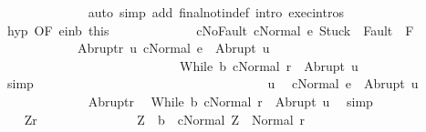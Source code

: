 \begin{isabellebody}
\ \ \ \ \ \ \ \ \ \ \ \ \isamarkupfalse%
\ {\isacharparenleft}auto\ simp\ add{\isacharcolon}\ final{\isacharunderscore}notin{\isacharunderscore}def\ intro{\isacharcolon}\ exec{\isachardot}intros{\isacharparenright}\isanewline
\ \ \ \ \ \ \ \ \ \ \isamarkupfalse%
\ hyp\ {\isacharbrackleft}OF\ e{\isacharunderscore}in{\isacharunderscore}b\ this{\isacharbrackright}\ \isamarkupfalse%
\isanewline
\ \ \ \ \ \ \ \ \ \ \ \ cNoFault{\isacharcolon}\ {\isachardoublequoteopen}{\isasymGamma}{\isasymturnstile}{\isasymlangle}c{\isacharcomma}Normal\ e{\isasymrangle}\ {\isasymRightarrow}{\isasymnotin}{\isacharparenleft}{\isacharbraceleft}Stuck{\isacharbraceright}\ {\isasymunion}\ Fault\ {\isacharbackquote}\ {\isacharparenleft}{\isacharminus}F{\isacharparenright}{\isacharparenright}{\isachardoublequoteclose}\ \isanewline
\ \ \ \ \ \ \ \ \ \ \ \ Abrupt{\isacharunderscore}r{\isacharcolon}\ {\isachardoublequoteopen}{\isasymforall}u{\isachardot}\ {\isasymGamma}{\isasymturnstile}{\isasymlangle}c{\isacharcomma}Normal\ e{\isasymrangle}\ {\isasymRightarrow}\ Abrupt\ u\ {\isasymlongrightarrow}\ \isanewline
\ \ \ \ \ \ \ \ \ \ \ \ \ \ \ \ \ \ \ \ \ \ \ \ \ \ \ \ {\isasymGamma}{\isasymturnstile}{\isasymlangle}While\ b\ c{\isacharcomma}Normal\ r{\isasymrangle}\ {\isasymRightarrow}\ Abrupt\ u{\isachardoublequoteclose}\isanewline
\ \ \ \ \ \ \ \ \ \ \ \ \isamarkupfalse%
\ simp\isanewline
\ \ \ \ \ \ \ \ \ \ \isanewline
\ \ \ \ \ \ \ \ \ \ \ \isacommand{{\isacharbraceleft}}\isamarkupfalse%
\isanewline
\ \ \ \ \ \ \ \ \ \ \ \ \isamarkupfalse%
\ u\ \isamarkupfalse%
\ {\isachardoublequoteopen}{\isasymGamma}{\isasymturnstile}{\isasymlangle}c{\isacharcomma}Normal\ e{\isasymrangle}\ {\isasymRightarrow}\ Abrupt\ u{\isachardoublequoteclose}\isanewline
\ \ \ \ \ \ \ \ \ \ \ \ \isamarkupfalse%
\ Abrupt{\isacharunderscore}r\ \isamarkupfalse%
\ {\isachardoublequoteopen}{\isasymGamma}{\isasymturnstile}{\isasymlangle}While\ b\ c{\isacharcomma}Normal\ r{\isasymrangle}\ {\isasymRightarrow}\ Abrupt\ u{\isachardoublequoteclose}\ \isamarkupfalse%
\ simp\isanewline
\ \ \ \ \ \ \ \ \ \ \ \ \isamarkupfalse%
\ \isamarkupfalse%
\ \ Z{\isacharunderscore}r\ \isamarkupfalse%
\isanewline
\ \ \ \ \ \ \ \ \ \ \ \ \ \ {\isachardoublequoteopen}Z\ {\isasymin}\ b{\isachardoublequoteclose}\ \ {\isachardoublequoteopen}{\isasymGamma}{\isasymturnstile}{\isasymlangle}c{\isacharcomma}Normal\ Z{\isasymrangle}\ {\isasymRightarrow}\ Normal\ r{\isachardoublequoteclose}\isanewline

\end{isabellebody}
